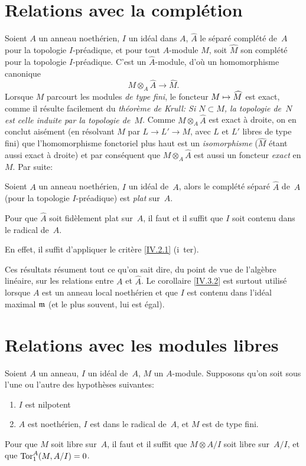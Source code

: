\section{Relations avec la compl\'etion}
\label{IV.3}
Soient $A$ un anneau noeth\'erien, $I$ un id\'eal dans $A$,
$\widehat{A}$ le s\'epar\'e compl\'et\'e de~$A$ pour la
topologie $I$-pr\'eadique, et pour tout $A$-module $M$, soit
$\widehat{M}$ son compl\'et\'e pour la topologie
$I$-pr\'eadique. C'est un $\widehat{A}$-module, d'o\`u un
homomorphisme canonique
$$
M \otimes_A \widehat{A} \to \widehat{M}.
$$
Lorsque $M$ parcourt les modules \emph{de type fini}, le foncteur $M
\mto \widehat{M}$ est exact, comme il r\'esulte facilement du
\emph{théorème de Krull: Si $N \subset M$, la topologie de~$N$
est celle induite par la topologie de~$M$}. Comme $M \otimes_A
\widehat{A}$ est exact \`a droite, on en conclut ais\'ement (en
r\'esolvant $M$ par $L \to L' \to M$, avec $L$ et $L'$ libres de
type fini) que l'homomorphisme fonctoriel plus haut est un
\emph{isomorphisme} ($\widehat{M}$ \'etant aussi exact \`a droite)
et par cons\'equent que $M \otimes_A \widehat{A}$ est aussi un
foncteur \emph{exact} en $M$. Par suite:
\begin{proposition}
\label{IV.3.1}
Soient $A$ un anneau noeth\'erien, $I$ un id\'eal de~$A$, alors le
compl\'et\'e s\'epar\'e $\widehat{A}$ de~$A$ (pour la
topologie $I$-pr\'eadique) est \emph{plat} sur~$A$.
\end{proposition}

\begin{corollaire}
\label{IV.3.2}
Pour que $\widehat{A}$ soit fid\`element plat sur~$A$, il faut et il
suffit que $I$ soit contenu dans le radical de~$A$.
\end{corollaire}

En effet, il suffit d'appliquer le crit\`ere \ref{IV.2.1} (i~ter).

Ces r\'esultats r\'esument tout ce qu'on sait dire, du point de
vue de l'alg\`ebre lin\'eaire, sur les relations entre $A$ et
$\widehat{A}$. Le corollaire \ref{IV.3.2} est surtout utilis\'e lorsque $A$
est un anneau local noeth\'erien et que $I$ est contenu dans
l'id\'eal maximal $\mathfrak{m}$ (et le plus souvent, lui est \'egal).

\section{Relations avec les modules libres}
\label{IV.4}

\begin{proposition}
\label{IV.4.1}
Soient $A$ un anneau, $I$ un id\'eal de~$A$, $M$ un
$A$-module. Supposons qu'on soit sous l'une ou l'autre des
hypoth\`eses suivantes:
\begin{enumerate}
\item[(a)] $I$ est nilpotent
\item[(b)] $A$ est noeth\'erien, $I$ est dans le radical de~$A$, et
$M$ est de type fini.
\end{enumerate}
Pour que $M$ soit libre sur~$A$, il faut et il suffit que $M \otimes
A/I$ soit libre sur~$A/I$, et que $\operatorname{Tor}_1^A(M,A/I) = 0$.
\end{proposition}

